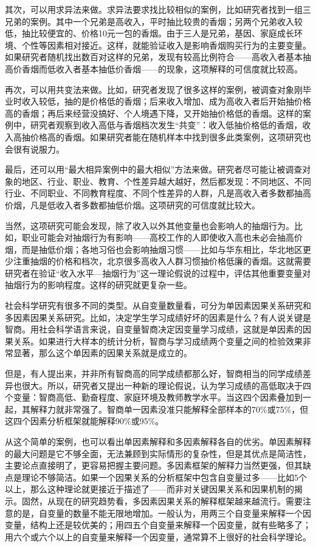 其次，可以用求异法来做。求异法要求找比较相似的案例，比如研究者找到一组三兄弟的案例。其中一个兄弟是高收入，平时抽比较贵的香烟；另两个兄弟收入较低，抽比较便宜的、价格10元一包的香烟。由于三人是兄弟，基因、家庭成长环境、个性等因素相对接近。这样，就能验证收入是影响香烟购买行为的主要变量。如果研究者随机找出数百对这样的兄弟，发现有较高比例符合——高收入者基本抽高价香烟而低收入者基本抽低价香烟——的现象，这项解释的可信度就比较高。

再次，可以用共变法来做。比如，研究者发现了很多这样的案例，被调查对象刚毕业时收入较低，抽的是价格低的香烟；后来收入增加、成为高收入者后开始抽价格高的香烟；再后来经营没搞好、个人境遇下降，又开始抽价格低的香烟。这样的案例中，研究者观察到收入高低与香烟档次发生“共变”：收入低抽价格低的香烟，收入高抽价格高的香烟。如果研究者能在随机样本中找到很多此类案例，这项研究也会很有说服力。

最后，还可以用“最大相异案例中的最大相似”方法来做。研究者尽可能让被调查对象的地区、行业、职业、教育、个性差异越大越好，然后都发现：不同地区、不同行业、不同职业、不同教育程度、不同个性差异的人群，凡是高收入者多数都抽高价烟，凡是低收入者多数都抽低价烟。这项研究的可信度就比较大。

当然，这项研究可能会发现，除了收入以外其他变量也会影响人的抽烟行为。比如，职业可能会对抽烟行为有影响——高校工作的人即使收入高也未必会抽高价烟，而是抽低价烟；各地习俗也会影响抽烟习惯——比如与华东相比，华北地区更少注重抽烟的价格和档次，北京很多高收入人群习惯抽价格低廉的香烟。这就需要研究者在验证“收入水平—抽烟行为”这一理论假说的过程中，评估其他重要变量对抽烟行为的影响程度。这样的研究就更复杂一些。


社会科学研究有很多不同的类型。从自变量数量看，可分为单因素因果关系研究和多因素因果关系研究。比如，决定学生学习成绩好坏的因素是什么？有人说关键是智商。用社会科学语言来说，自变量智商决定因变量学习成绩，这就是单因素的因果关系。如果进行大样本的统计分析，智商与学习成绩两个变量之间的检验效果非常显著，那么这个单因素的因果关系就是成立的。

但是，有人提出来，并非所有智商高的同学成绩都那么好，智商相当的同学成绩差异也很大。所以，研究者又提出一种新的理论假说，认为学习成绩的高低取决于四个变量：智商高低、勤奋程度、家庭环境及教师教学水平。当这四个因素叠加到一起，其解释力就非常强了。智商单一因素没准只能解释全部样本的70\%或75\%，但这四个因素分析框架就能解释90\%或95\%。

从这个简单的案例，也可以看出单因素解释和多因素解释各自的优劣。单因素解释的最大问题是它不够全面，无法兼顾到实际情形的复杂性，但是其优点是简洁性，主要论点直接明了，更容易把握主要问题。多因素框架的解释力当然更强，但其缺点是理论不够简洁。如果一个因果关系的分析框架中包含自变量过多——比如5个以上，那么这种理论就更接近于描述了——而非对关键因果关系和因果机制的揭示。固然，从现在的研究趋势看，多因素因果关系的解释框架越来越流行。需要注意的是，自变量的数量不能无限地增加。一般认为，用两三个自变量来解释一个因变量，结构上还是较优美的；用四五个自变量来解释一个因变量，就有些略多了；用六个或六个以上的自变量来解释一个因变量，通常算不上很好的社会科学理论。

